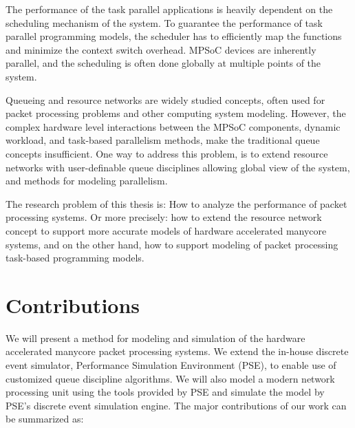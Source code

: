 The performance of the task parallel applications is heavily dependent on the scheduling mechanism of the system. To guarantee the performance of task parallel programming models, the scheduler has to efficiently map the functions and minimize the context switch overhead. MPSoC devices are inherently parallel, and the scheduling is often done globally at multiple points of the system.



Queueing and resource networks are widely studied concepts, often used for packet processing problems and other computing system modeling. However, the complex hardware level interactions between the MPSoC components, dynamic workload, and task-based parallelism methods, make the traditional queue concepts insufficient. One way to address this problem, is to extend resource networks with user-definable queue disciplines allowing global view of the system, and methods for modeling parallelism.

The research problem of this thesis is: How to analyze the performance of packet processing systems. Or more precisely: how to extend the resource network concept to support more accurate models of hardware accelerated manycore systems, and on the other hand, how to support modeling of packet processing task-based programming models.

\section{Contributions}
We will present a method for modeling and simulation of the hardware accelerated manycore packet processing systems. We extend the in-house discrete event simulator, Performance Simulation Environment (PSE), to enable use of customized queue discipline algorithms. We will also model a modern network processing unit using the tools provided by PSE and simulate the model by PSE's discrete event simulation engine. The major contributions of our work can be summarized as:



